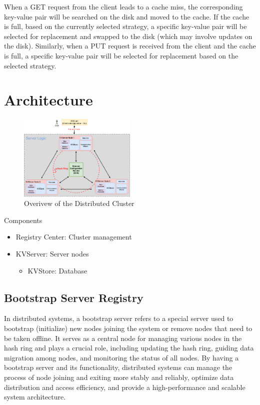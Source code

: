 \documentclass[sigconf]{acmart}
\begin{document}
When a GET request from the client leads to a cache miss, the corresponding key-value pair will be searched on the disk and moved to the cache. If the cache is full, based on the currently selected strategy, a specific key-value pair will be selected for replacement and swapped to the disk (which may involve updates on the disk). Similarly, when a PUT request is received from the client and the cache is full, a specific key-value pair will be selected for replacement based on the selected strategy.


\section{Architecture}
\begin{figure}[htbp]
    \centering
    \includegraphics[width=0.5\textwidth]{cloud_database_report/asset/overview.png}
    \caption{Overivew of the Distributed Cluster}
    \label{fig:xxx}
\end{figure}
Components
\begin{itemize}
    \item Registry Center: Cluster management
    \item KVServer: Server nodes
    \begin{itemize}
        \item KVStore: Database
    \end{itemize}
\end{itemize}

\subsection{Bootstrap Server Registry}

In distributed systems, a bootstrap server refers to a special server used to bootstrap (initialize) new nodes joining the system or remove nodes that need to be taken offline. It serves as a central node for managing various nodes in the hash ring and plays a crucial role, including updating the hash ring, guiding data migration among nodes, and monitoring the status of all nodes. By having a bootstrap server and its functionality, distributed systems can manage the process of node joining and exiting more stably and reliably, optimize data distribution and access efficiency, and provide a high-performance and scalable system architecture.
\end{document}
